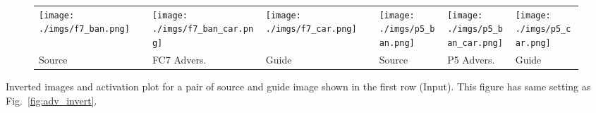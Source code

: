\documentclass{article} %
\begin{document}
\begin{subfigure}[t]{\linewidth}{
\centering
\renewcommand{\arraystretch}{1}
\setlength\tabcolsep{.1pt}
\begin{tabular}{
|>{\centering\arraybackslash}m{0.205\linewidth}
>{\centering\arraybackslash}m{0.205\linewidth}
>{\centering\arraybackslash}m{0.205\linewidth}|
>{\centering\arraybackslash}m{0.125\linewidth}
>{\centering\arraybackslash}m{0.125\linewidth}
>{\centering\arraybackslash}m{0.125\linewidth}|
}
\hline
\texttt{[image: ./imgs/f7\_ban.png]} &
\texttt{[image: ./imgs/f7\_ban\_car.png]} &
\texttt{[image: ./imgs/f7\_car.png]} &
\texttt{[image: ./imgs/p5\_ban.png]} &
\texttt{[image: ./imgs/p5\_ban\_car.png]} &
\texttt{[image: ./imgs/p5\_car.png]}\\
Source & FC7 Advers. & Guide & Source & P5 Advers. & Guide \\ \hline
\end{tabular}
}
\end{subfigure}
\caption{
    Inverted images and activation plot for a pair of source and guide image 
    shown in the first row (Input). This figure has same setting as 
    Fig.~\ref{fig:adv_invert}.
}
\label{fig:adv_invert5}
\end{document}

